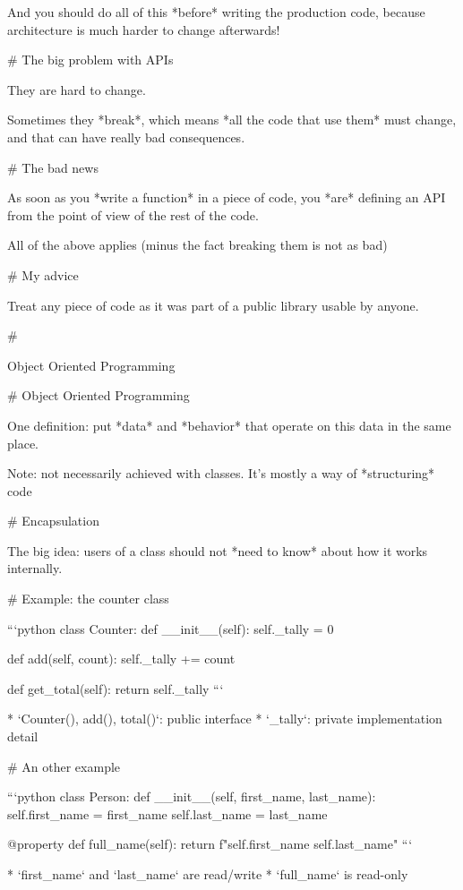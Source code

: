 And you should do all  of this *before* writing the production code, because
architecture is much harder to change afterwards!

# The big problem with APIs

They are hard to change.

Sometimes they *break*, which means *all the code that use them* must change,
and that can have really bad consequences.

# The bad news

As soon as you *write a function* in a piece of code, you *are* defining
an API from the point of view of the rest of the code.

All of the above applies (minus the fact breaking them is not as bad)

# My advice

Treat any piece of code as it was part of a public library usable by anyone.

#

\huge \center Object Oriented Programming

# Object Oriented Programming

One definition: put *data* and *behavior* that operate on this data in
the same place.


Note: not necessarily achieved with classes. It's mostly a way
of *structuring* code


# Encapsulation

The big idea: users of a class should not *need to know* about
how it works internally.

# Example: the counter class

```python
class Counter:
    def __init__(self):
        self._tally = 0

    def add(self, count):
        self._tally += count

    def get_total(self):
        return self._tally
```

* `Counter(), add(), total()`: public interface
* `_tally`: private implementation detail

# An other example

```python
class Person:
    def __init__(self, first_name, last_name):
        self.first_name = first_name
        self.last_name = last_name

    @property
    def full_name(self):
        return f"{self.first_name} {self.last_name}"
```

* `first_name` and `last_name` are read/write
* `full_name` is read-only

